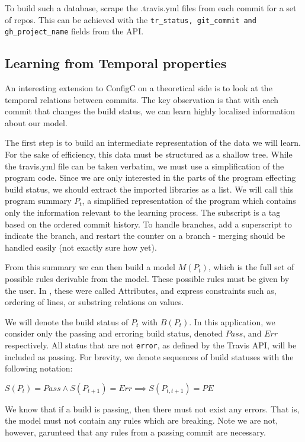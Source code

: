 \documentclass{sigplanconf}
\begin{document}
To build such a database, scrape the .travis.yml files from each commit for a set of repos.
This can be achieved with the \verb|tr_status, git_commit and gh_project_name| fields from the API.

\subsection{Learning from Temporal properties}

An interesting extension to ConfigC on a theoretical side is to look at the temporal relations between commits.
The key observation is that with each commit that changes the build status, we can learn highly localized information about our model.

The first step is to build an intermediate representation of the data we will learn.
For the sake of efficiency, this data must be structured as a shallow tree.
While the travis.yml file can be taken verbatim, we must use a simplification of the program code.
Since we are only interested in the parts of the program effecting build status, we should extract the imported libraries as a list.
We will call this program summary $P_t$, a simplified representation of the program which contains only the information relevant to the learning process.
The subscript is a tag based on the ordered commit history.
To handle branches, add a superscript to indicate the branch, and restart the counter on a branch - merging should be handled easily (not exactly sure how yet).

From this summary we can then build a model $M(P_t)$, which is the full set of possible rules derivable from the model.
These possible rules must be given by the user.
In \cite{Santolucito2016}, these were called Attributes, and express constraints such as, ordering of lines, or substring relations on values.

We will denote the build status of $P_t$ with $B(P_t)$.
In this application, we consider only the passing and erroring build status, denoted $Pass$, and $Err$ respectively.
All status that are not \verb|error|, as defined by the Travis API, will be included as passing.
For brevity, we denote sequences of build statuses with the following notation:

$S(P_t)=Pass \land S(P_{t+1})=Err \implies S(P_{t,t+1}) = PE$

We know that if a build is passing, then there must not exist any errors.
That is, the model must not contain any rules which are breaking.
Note we are not, however, garunteed that any rules from a passing commit are necessary.
\end{document}
